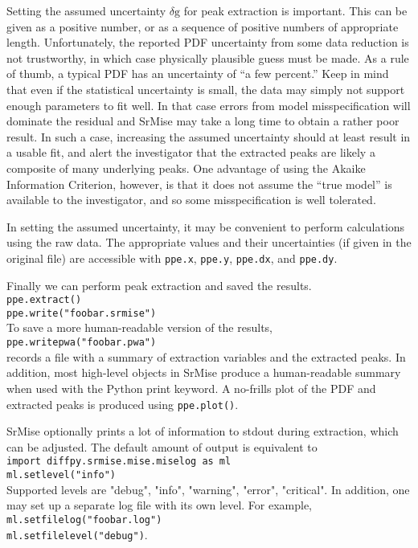 \documentclass[12pt]{article}
\newcommand{\dg}{\ensuremath{\delta\mathrm{g}}}
\begin{document}
Setting the assumed uncertainty $\dg$ for peak extraction is important.  This can be given as a positive number, or as a sequence of positive numbers of appropriate length.  Unfortunately, the reported PDF uncertainty from some data reduction is not trustworthy, in which case physically plausible guess must be made.  As a rule of thumb, a typical PDF has an uncertainty of ``a few percent.''  Keep in mind that even if the statistical uncertainty is small, the data may simply not support enough parameters to fit well.  In that case errors from model misspecification will dominate the residual and {\sc SrMise} may take a long time to obtain a rather poor result.  In such a case, increasing the assumed uncertainty should at least result in a usable fit, and alert the investigator that the extracted peaks are likely a composite of many underlying peaks.  One advantage of using the Akaike Information Criterion, however, is that it does not assume the ``true model'' is available to the investigator, and so some misspecification is well tolerated.

In setting the assumed uncertainty, it may be convenient to perform calculations using the raw data.  The appropriate values and their uncertainties (if given in the original file) are accessible with \texttt{ppe.x}, \texttt{ppe.y}, \texttt{ppe.dx}, and \texttt{ppe.dy}.

Finally we can perform peak extraction and saved the results.\\
\texttt{ppe.extract()}\\
\texttt{ppe.write("foobar.srmise")}\\
To save a more human-readable version of the results,\\
\texttt{ppe.writepwa("foobar.pwa")}\\
records a file with a summary of extraction variables and the extracted peaks.  In addition, most high-level objects in {\sc SrMise} produce a human-readable summary when used with the Python print keyword.  A no-frills plot of the PDF and extracted peaks is produced using \texttt{ppe.plot()}.

{\sc SrMise} optionally prints a lot of information to stdout during extraction, which can be adjusted.  The default amount of output is equivalent to\\
\texttt{import diffpy.srmise.mise.miselog as ml}\\
\texttt{ml.setlevel("info")}\\
Supported levels are "debug", "info", "warning", "error", "critical".  In addition, one may set up a separate log file with its own level.  For example,\\
\texttt{ml.setfilelog("foobar.log")}\\
\texttt{ml.setfilelevel("debug")}.
\end{document}
